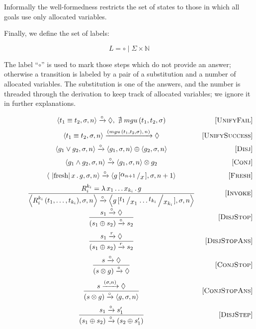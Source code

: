 Informally the well-formedness restricts the set of states to those in which all goals use only allocated variables.

Finally, we define the set of labels:

\[
L = \circ \mid \Sigma\times \mathbb{N}
\]

The label ``$\circ$'' is used to mark those steps which do not provide an answer; otherwise a transition is labeled by a pair of a substitution and a number of allocated
variables. The substitution is one of the answers, and the number is threaded through the derivation to keep track of allocated variables; we ignore it in further explanations.

\begin{figure}
  \[
  \begin{array}{cr}
    \inbr{t_1 \equiv t_2, \sigma, n} \xrightarrow{\circ} \Diamond , \, \, \nexists\; mgu\,(t_1, t_2, \sigma) &\ruleno{UnifyFail} \\[2mm]
    \inbr{t_1 \equiv t_2, \sigma, n} \xrightarrow{(mgu\,(t_1, t_2, \sigma),\, n)} \Diamond & \ruleno{UnifySuccess} \\[2mm]
    \inbr{g_1 \lor g_2, \sigma, n} \xrightarrow{\circ} \inbr{g_1, \sigma, n} \oplus \inbr{g_2, \sigma, n} & \ruleno{Disj} \\[2mm]
    \inbr{g_1 \land g_2, \sigma, n} \xrightarrow{\circ} \inbr{ g_1, \sigma, n} \otimes g_2 & \ruleno{Conj} \\[2mm]
    \inbr{\mbox{\lstinline|fresh|}\, x\, .\, g, \sigma, n} \xrightarrow{\circ} \inbr{g\,[\bigslant{\alpha_{n + 1}}{x}], \sigma, n + 1} & \ruleno{Fresh}\\[2mm]
    \dfrac{R_i^{k_i}=\lambda\,x_1\dots x_{k_i}\,.\,g}{\inbr{R_i^{k_i}\,(t_1,\dots,t_{k_i}),\sigma,n} \xrightarrow{\circ} \inbr{g\,[\bigslant{t_1}{x_1}\dots\bigslant{t_{k_i}}{x_{k_i}}], \sigma, n}} & \ruleno{Invoke}\\[5mm]
    \dfrac{s_1 \xrightarrow{\circ} \Diamond}{(s_1 \oplus s_2) \xrightarrow{\circ} s_2} & \ruleno{DisjStop}\\[5mm]
    \dfrac{s_1 \xrightarrow{r} \Diamond}{(s_1 \oplus s_2) \xrightarrow{r} s_2} & \ruleno{DisjStopAns}\\[5mm]
    \dfrac{s \xrightarrow{\circ} \Diamond}{(s \otimes g) \xrightarrow{\circ} \Diamond} &\ruleno{ConjStop}\\[5mm]
    \dfrac{s \xrightarrow{(\sigma, n)} \Diamond}{(s \otimes g) \xrightarrow{\circ} \inbr{g, \sigma, n}}  & \ruleno{ConjStopAns}\\[5mm]
    \dfrac{s_1 \xrightarrow{\circ} s'_1}{(s_1 \oplus s_2) \xrightarrow{\circ} (s_2 \oplus s'_1)} &\ruleno{DisjStep}\\[5mm]

\end{array}\]
\end{figure}

